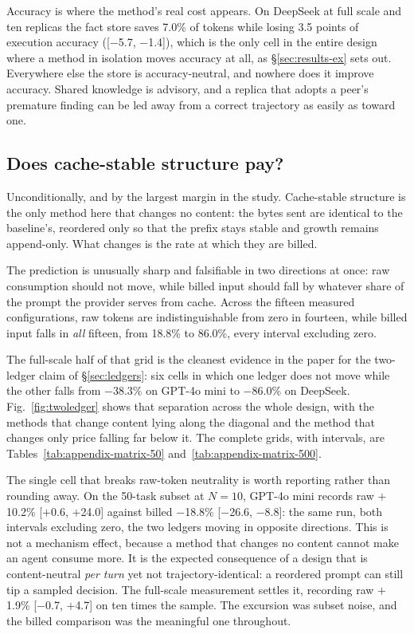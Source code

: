 \documentclass[conference]{IEEEtran}
\begin{document}
Accuracy is where the method's real cost appears. On DeepSeek at full scale and
ten replicas the fact store saves 7.0\% of tokens while losing 3.5 points of
execution accuracy ([$-$5.7, $-$1.4]), which is the only cell in the entire
design where a method in isolation moves accuracy at all, as
§\ref{sec:results-ex} sets out. Everywhere else the store is accuracy-neutral, and
nowhere does it improve accuracy. Shared knowledge is advisory, and a replica
that adopts a peer's premature finding can be led away from a correct
trajectory as easily as toward one.

\subsection{Does cache-stable structure pay?}\label{sec:results-pcache}

Unconditionally, and by the largest margin in the study. Cache-stable structure
is the only method here that changes no content: the bytes sent are identical to
the baseline's, reordered only so that the prefix stays stable and growth
remains append-only. What changes is the rate at which they are billed.

The prediction is unusually sharp and falsifiable in two directions at once:
raw consumption should not move, while billed input should fall by whatever
share of the prompt the provider serves from cache. Across the fifteen measured
configurations, raw tokens are indistinguishable from zero in fourteen, while
billed input falls in \emph{all} fifteen, from 18.8\% to 86.0\%, every interval
excluding zero.


The full-scale half of that grid is the cleanest evidence in the paper for the
two-ledger claim of §\ref{sec:ledgers}: six cells in which one ledger does not
move while the other falls from $-$38.3\% on GPT-4o mini to $-$86.0\% on
DeepSeek. Fig.~\ref{fig:twoledger} shows that
separation across the whole design, with the methods that change content lying
along the diagonal and the method that changes only price falling far below it.
The complete grids, with intervals, are
Tables~\ref{tab:appendix-matrix-50} and~\ref{tab:appendix-matrix-500}.

The single cell that breaks raw-token neutrality is worth reporting rather than
rounding away. On the 50-task subset at $N = 10$, GPT-4o mini records raw
$+$10.2\% [$+$0.6, $+$24.0] against billed $-$18.8\% [$-$26.6, $-$8.8]: the same
run, both intervals excluding zero, the two ledgers moving in opposite
directions. This is not a mechanism effect, because a method that changes no
content cannot make an agent consume more. It is the expected consequence of a
design that is content-neutral \emph{per turn} yet not trajectory-identical: a
reordered prompt can still tip a sampled decision. The full-scale measurement
settles it, recording raw $+$1.9\% [$-$0.7, $+$4.7] on ten times the sample. The
excursion was subset noise, and the billed comparison was the meaningful one
throughout.
\end{document}
